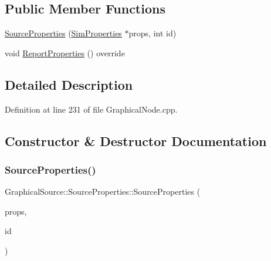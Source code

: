 \subsection*{Public Member Functions}
\begin{DoxyCompactItemize}
\item 
\hyperlink{class_graphical_source_1_1_source_properties_a0e04f201ee409f02b04ed995f0b24aa6}{Source\+Properties} (\hyperlink{class_graphical_node_1_1_sim_properties}{Sim\+Properties} $\ast$props, int id)
\item 
void \hyperlink{class_graphical_source_1_1_source_properties_a186fd47eaec7e6499665c31580d9e3fc}{Report\+Properties} () override
\end{DoxyCompactItemize}


\subsection{Detailed Description}


Definition at line 231 of file Graphical\+Node.\+cpp.



\subsection{Constructor \& Destructor Documentation}
\mbox{\label{class_graphical_source_1_1_source_properties_a0e04f201ee409f02b04ed995f0b24aa6}} 
\subsubsection{\texorpdfstring{Source\+Properties()}{SourceProperties()}}
{\footnotesize\ttfamily Graphical\+Source\+::\+Source\+Properties\+::\+Source\+Properties (\begin{DoxyParamCaption}\item[{\hyperlink{class_graphical_node_1_1_sim_properties}{Sim\+Properties} $\ast$}]{props,  }\item[{int}]{id }\end{DoxyParamCaption})\hspace{0.3cm}{\ttfamily [inline]}}




